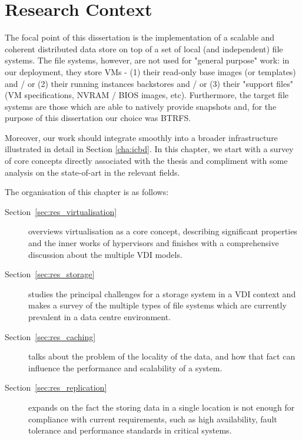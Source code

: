 
\chapter{Research Context}
\label{cha:research_context}

The focal point of this dissertation is the implementation of a scalable and coherent distributed data store on top of a set of local (and independent) file systems. The file systems, however, are not used for "general purpose" work: in our deployment, they store VMs - (1) their read-only base images (or templates) and / or (2) their running instances backstores and / or (3) their "support files" (VM specifications, NVRAM / BIOS images, etc).
Furthermore, the target file systems are those which are able to natively provide snapshots and, for the purpose of this dissertation our choice was BTRFS.


 
 Moreover, our work should integrate smoothly into a broader infrastructure illustrated in detail in Section \ref{cha:icbd}.
In this chapter, we start with a survey of core concepts directly associated with the thesis and compliment with some analysis on the state-of-art in the relevant fields.

The organisation of this chapter is as follows:

\begin{description}
	\item [Section~\ref{sec:res_virtualisation}] overviews virtualisation as a core concept, describing significant properties and the inner works of hypervisors and finishes with a comprehensive discussion about the multiple VDI models.
	\item [Section~\ref{sec:res_storage}] studies the principal challenges for a storage system in a VDI context and makes a survey of the multiple types of file systems which are currently prevalent in a data centre environment. 
	\item [Section~\ref{sec:res_caching}] talks about the problem of the locality of the data, and how that fact can influence the performance and scalability of a system.
	\item [Section~\ref{sec:res_replication}] expands on the fact the storing data in a single location is not enough for compliance with current requirements, such as high availability, fault tolerance and performance standards in critical systems.
\end{description}

